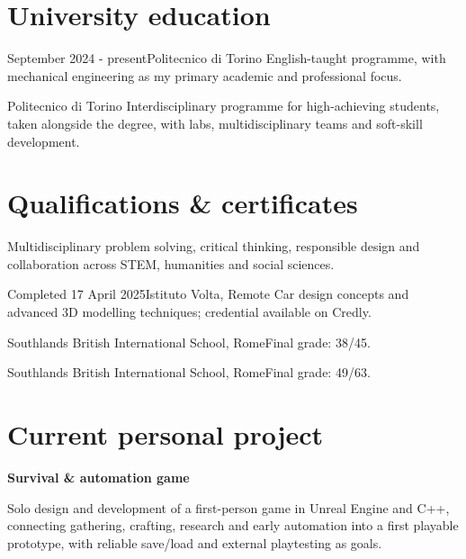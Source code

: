 \documentclass[a4paper,10pt]{article}
\begin{document}
\section*{University education}
  {September 2024 - present}{Politecnico di Torino}
  {English-taught programme, with mechanical engineering as my primary academic
  and professional focus.}

  {Politecnico di Torino}
  {Interdisciplinary programme for high-achieving students, taken alongside
  the degree, with labs, multidisciplinary teams and soft-skill development.}

\newpage

\section*{Qualifications \& certificates}
  {Multidisciplinary problem solving, critical thinking, responsible design
  and collaboration across STEM, humanities and social sciences.}

  {Completed 17 April 2025}{Istituto Volta, Remote}
  {Car design concepts and advanced 3D modelling techniques; credential
  available on Credly.}

  {Southlands British International School, Rome}{Final grade: 38/45.}

  {Southlands British International School, Rome}{Final grade: 49/63.}

\section*{Current personal project}
\textbf{Survival \& automation game}\par
Solo design and development of a first-person game in Unreal Engine and C++,
connecting gathering, crafting, research and early automation into a first
playable prototype, with reliable save/load and external playtesting as goals.
\end{document}
